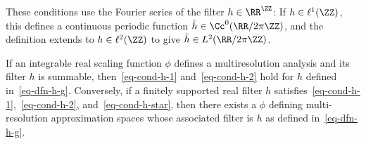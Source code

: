 These conditions use the Fourier series of the filter $h \in \RR^\ZZ$:
If $h \in \ell^1(\ZZ)$, this defines a continuous periodic function $\hat h \in \Cc^0(\RR/2\pi\ZZ)$, and the definition extends to $h \in \ell^2(\ZZ)$ to give $\hat h \in L^2(\RR/2\pi\ZZ)$.

\begin{thm}\label{thm-multires-approx}
	If an integrable real scaling function $\phi$ defines a multiresolution analysis and its filter $h$ is summable, then~\eqref{eq-cond-h-1} and~\eqref{eq-cond-h-2} hold for $h$ defined in~\eqref{eq-dfn-h-g}.
	Conversely, if a finitely supported real filter $h$ satisfies~\eqref{eq-cond-h-1},~\eqref{eq-cond-h-2}, and~\eqref{eq-cond-h-star}, then there exists a $\phi$ defining multi-resolution approximation spaces whose associated filter is $h$ as defined in~\eqref{eq-dfn-h-g}.
\end{thm}

